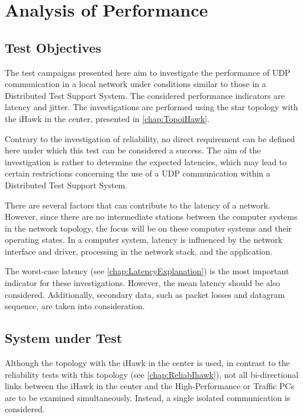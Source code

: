 \chapter{Analysis of Performance}

\section{Test Objectives}
The test campaigns presented here aim to investigate the performance of UDP communication in a local network under conditions similar to those in a Distributed Test Support System. The considered performance indicators are latency and jitter. The investigations are performed using the star topology with the iHawk in the center, presented in \ref{chap:TopoiHawk}.

Contrary to the investigation of reliability, no direct requirement can be defined here under which this test can be considered a success. The aim of the investigation is rather to determine the expected latencies, which may lead to certain restrictions concerning the use of a UDP communication within a Distributed Test Support System.

There are several factors that can contribute to the latency of a network. However, since there are no intermediate stations between the computer systems in the network topology, the focus will be on these computer systems and their operating states. In a computer system, latency is influenced by the network interface and driver, processing in the network stack, and the application.

The worst-case latency (see \ref{chap:LatencyExplanation}) is the most important indicator for these investigations. However, the mean latency should be also considered. Additionally, secondary data, such as packet losses and datagram sequence, are taken into consideration.

\section{System under Test}
Although the topology with the iHawk in the center is used, in contrast to the reliability tests with this topology (see \ref{chap:ReliabIhawk}), not all bi-directional links between the iHawk in the center and the High-Performance or Traffic PCs are to be examined simultaneously. Instead, a single isolated communication is considered.


